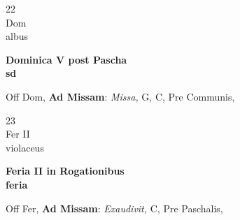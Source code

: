 \documentclass[10pt, openany]{book}
\begin{document}
        \begin{center}
            \begin{minipage}{3.5in}
                \vspace{2em}
                \begin{minipage}{0.5in}
                    {\Huge 22} \\
                    {\normalsize Dom} \\
                    {\normalsize albus}
                \end{minipage}
                \begin{minipage}{3.0in}
                    \textbf{ \large Dominica V post Pascha \\
                    \textnormal{\normalsize sd}} \\ 
                \end{minipage}
                \begin{justify}Off Dom, \textbf{Ad Missam}: \textit{Missa,} G, C, Pre Communis,  
                \end{justify}
            \end{minipage}
        \end{center}
    
        \begin{center}
            \begin{minipage}{3.5in}
                \vspace{2em}
                \begin{minipage}{0.5in}
                    {\Huge 23} \\
                    {\normalsize Fer II} \\
                    {\normalsize violaceus}
                \end{minipage}
                \begin{minipage}{3.0in}
                    \textbf{ \large Feria II in Rogationibus \\
                    \textnormal{\normalsize feria}} \\ 
                \end{minipage}
                \begin{justify}Off Fer, \textbf{Ad Missam}: \textit{Exaudivit,} C, Pre Paschalis,  
                \end{justify}
            \end{minipage}
        \end{center}
    
\end{document}
